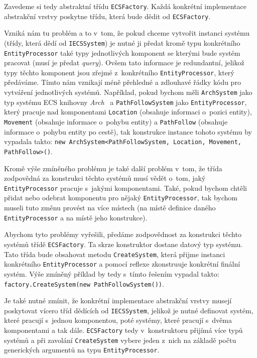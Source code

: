 Zavedeme si tedy abstraktní třídu \verb|ECSFactory|. Každá konkrétní implementace abstrakční vrstvy poskytne třídu, která bude dědit od \verb|ECSFactory|.

Vzniká nám tu problém a to v~tom, že pokud chceme vytvořit instanci systému (třídy, která dědí od \verb|IECSSystem|) je nutné ji předat kromě typu konkrétního \verb|EntityProcessor| také typy jednotlivých komponent se kterými bude systém pracovat (musí je předat \textit{query}). Ovšem tato informace je redundantní, jelikož typy těchto komponent jsou zřejmé z~konkrétního \verb|EntityProcessor|, který předáváme. Tímto nám vznikají méně přehledné a zdlouhavé řádky kódu pro vytváření jednotlivých systémů. Například, pokud bychom měli \verb|ArchSystem| jako typ systému ECS knihovny \textit{Arch}~\cite{Arch} a \verb|PathFollowSystem| jako \verb|EntityProcessor|, který pracuje nad komponentami \verb|Location| (obsahuje informaci o~pozici entity), \verb|Movement| (obsahuje informace o~pohybu entity) a \verb|PathFollow| (obsahuje informace o~pohybu entity po cestě), tak konstrukce instance tohoto systému by vypadala takto: \texttt{new ArchSystem<PathFollowSystem, Location, Movement, PathFollow>()}.

Kromě výše zmíněného problému je také další problém v~tom, že třída zodpovědná za konstrukci těchto systémů musí vědět o~tom, jaký \verb|EntityProcessor| pracuje s~jakými komponentami. Také, pokud bychom chtěli přidat nebo odebrat komponentu pro nějaký \verb|EntityProcessor|, tak bychom museli tuto změnu provést na více místech (na místě definice daného \verb|EntityProcessor| a na místě jeho konstrukce).

Abychom tyto problémy vyřešili, předáme zodpovědnost za konstrukci těchto systémů třídě \verb|ECSFactory|. Ta skrze konstruktor dostane datový typ systému. Tato třída bude obsahovat metodu \verb|CreateSystem|, která přijme instanci konkrétního \verb|EntityProcessor| a pomocí reflexe zkonstruuje konkrétní finální systém. Výše zmíněný příklad by tedy s~tímto řešením vypadal takto: \verb|factory.CreateSystem(new PathFollowSystem())|.

Je také nutné zmínit, že konkrétní implementace abstrakční vrstvy musejí poskytovat vícero tříd dědících od \verb|IECSSystem|, jelikož je nutné definovat systém, které pracují s~jednou komponentou, poté systémy, které pracují s~dvěma komponentami a tak dále. \verb|ECSFactory| tedy v~konstruktoru přijímá více typů systémů a při zavolání \verb|CreateSystem| vybere jeden z~nich na základě počtu generických argumentů na typu \verb|EntityProcessor|.

